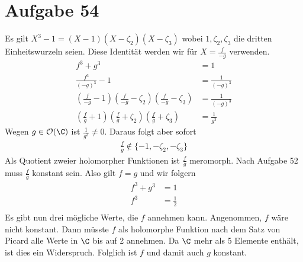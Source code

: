 \documentclass{article}
\begin{document}
\section*{Aufgabe 54}
Es gilt $X^3 - 1 = (X - 1)(X - \zeta_2)(X- \zeta_3)$ wobei $1, \zeta_2, \zeta_3$ die dritten Einheitswurzeln seien.
Diese Identität werden wir für $X = \frac{f}{-g}$ verwenden.
\begin{align*}
  f^3 + g^3 &= 1\\
  \frac{f^3}{(-g)^3} - 1 &= \frac{1}{(-g)^3}\\
  (\frac{f}{-g} - 1)(\frac{f}{-g} - \zeta_2)(\frac{f}{-g}- \zeta_3) &= \frac{1}{(-g)^3}\\
  (\frac{f}{g} + 1)(\frac{f}{g} + \zeta_2)(\frac{f}{g} + \zeta_3) &= \frac{1}{g^3}
\end{align*}
Wegen $g \in \mathcal{O}(\C)$ ist $\frac{1}{g^3}\neq 0$. Daraus folgt aber sofort 
\begin{align*}
  \frac{f}{g} \notin \{-1, - \zeta_2,-\zeta_3\}
\end{align*}
Als Quotient zweier holomorpher Funktionen ist $\frac{f}{g}$ meromorph. Nach Aufgabe 52 muss $\frac{f}{g}$ konstant sein.
Also gilt $f = g$ und wir folgern
\begin{align*}
  f^3 + g^3 &= 1\\
  f^3 &= \frac{1}{2}\\
\end{align*}
Es gibt nun drei mögliche Werte, die $f$ annehmen kann. Angenommen, $f$ wäre nicht konstant.
Dann müsste $f$ als holomorphe Funktion nach dem Satz von Picard alle Werte in $\C$ bis auf 2 annehmen.
Da $\C$ mehr als 5 Elemente enthält, ist dies ein Widerspruch. Folglich ist $f$ und damit auch $g$ konstant.
\end{document}
